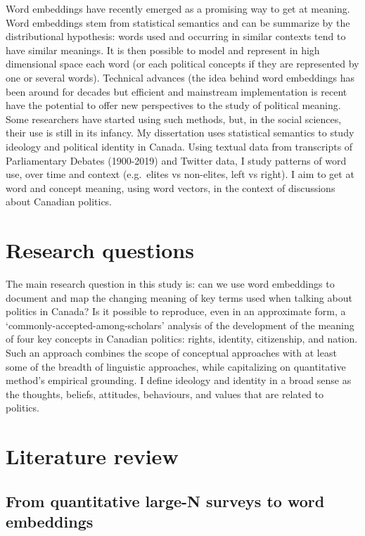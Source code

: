 \documentclass[
  openany]{book}
\begin{document}
Word embeddings have recently emerged as a promising way to get at meaning. Word embeddings stem from statistical semantics and can be summarize by the distributional hypothesis: words used and occurring in similar contexts tend to have similar meanings. It is then possible to model and represent in high dimensional space each word (or each political concepts if they are represented by one or several words). Technical advances (the idea behind word embeddings has been around for decades but efficient and mainstream implementation is recent \citep[\citet{mikolov2013efficient}]{mikolov2013distributed} have the potential to offer new perspectives to the study of political meaning. Some researchers have started using such methods, but, in the social sciences, their use is still in its infancy. My dissertation uses statistical semantics to study ideology and political identity in Canada. Using textual data from transcripts of Parliamentary Debates (1900-2019) and Twitter data, I study patterns of word use, over time and context (e.g.~elites vs non-elites, left vs right). I aim to get at word and concept meaning, using word vectors, in the context of discussions about Canadian politics.

\hypertarget{research-questions}{%
\chapter{Research questions}\label{research-questions}}

The main research question in this study is: can we use word embeddings to document and map the changing meaning of key terms used when talking about politics in Canada? Is it possible to reproduce, even in an approximate form, a `commonly-accepted-among-scholars' analysis of the development of the meaning of four key concepts in Canadian politics: rights, identity, citizenship, and nation. Such an approach combines the scope of conceptual approaches with at least some of the breadth of linguistic approaches, while capitalizing on quantitative method's empirical grounding. I define ideology and identity in a broad sense as the thoughts, beliefs, attitudes, behaviours, and values that are related to politics.

\hypertarget{literature-review}{%
\chapter{Literature review}\label{literature-review}}

\hypertarget{from-quantitative-large-n-surveys-to-word-embeddings}{%
\section{From quantitative large-N surveys to word embeddings}\label{from-quantitative-large-n-surveys-to-word-embeddings}}
\end{document}
